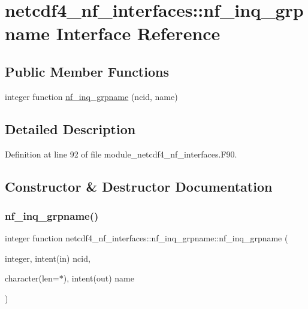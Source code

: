 \hypertarget{interfacenetcdf4__nf__interfaces_1_1nf__inq__grpname}{}\section{netcdf4\+\_\+nf\+\_\+interfaces\+:\+:nf\+\_\+inq\+\_\+grpname Interface Reference}
\label{interfacenetcdf4__nf__interfaces_1_1nf__inq__grpname}
\subsection*{Public Member Functions}
\begin{DoxyCompactItemize}
\item 
integer function \hyperlink{interfacenetcdf4__nf__interfaces_1_1nf__inq__grpname_a34cf9e9c8c1587162608bb206e66c53d}{nf\+\_\+inq\+\_\+grpname} (ncid, name)
\end{DoxyCompactItemize}


\subsection{Detailed Description}


Definition at line 92 of file module\+\_\+netcdf4\+\_\+nf\+\_\+interfaces.\+F90.



\subsection{Constructor \& Destructor Documentation}
\mbox{\label{interfacenetcdf4__nf__interfaces_1_1nf__inq__grpname_a34cf9e9c8c1587162608bb206e66c53d}} 
\subsubsection{\texorpdfstring{nf\+\_\+inq\+\_\+grpname()}{nf\_inq\_grpname()}}
{\footnotesize\ttfamily integer function netcdf4\+\_\+nf\+\_\+interfaces\+::nf\+\_\+inq\+\_\+grpname\+::nf\+\_\+inq\+\_\+grpname (\begin{DoxyParamCaption}\item[{integer, intent(in)}]{ncid,  }\item[{character(len=$\ast$), intent(out)}]{name }\end{DoxyParamCaption})}



